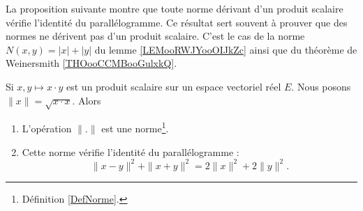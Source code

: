 La proposition suivante montre que toute norme dérivant d'un produit scalaire vérifie l'identité du parallélogramme. Ce résultat sert souvent à prouver que des normes ne dérivent pas d'un produit scalaire. C'est le cas de la norme \( N(x,y)=| x |+| y |\) du lemme \ref{LEMooRWJYooOIJkZc} ainsi que du théorème de Weinersmith \ref{THOooCCMBooGulxkQ}.
\begin{proposition} \label{PropEQRooQXazLz}
    Si \( x,y\mapsto x\cdot y\) est un produit scalaire sur un espace vectoriel réel \( E\). Nous posons \( \| x \|=\sqrt{x\cdot x}\). Alors
    \begin{enumerate}
        \item
            L'opération \( \| . \|\) est une norme\footnote{Définition \ref{DefNorme}.}.
        \item
            Cette norme vérifie l'identité du parallélogramme :
            \begin{equation}        \label{EqYCLtWfJ}
                \| x-y \|^2+\| x+y \|^2=2\| x \|^2+2\| y \|^2.
            \end{equation}
    \end{enumerate}
\end{proposition}


